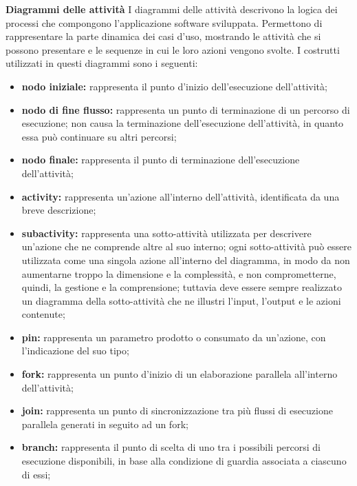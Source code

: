						\textbf{Diagrammi delle attività}
						\newline
						\newline
						\hangindent=0.6cm I diagrammi delle attività descrivono la logica dei processi che compongono l'applicazione software sviluppata. Permettono di rappresentare la parte dinamica dei casi d'uso, mostrando le attività che si possono presentare e le sequenze in cui le loro azioni vengono svolte.
						\newline
						\hangindent=0.6cm I costrutti utilizzati in questi diagrammi sono i seguenti:
						\begin{itemize}[leftmargin=1.5cm]
							\item \textbf{nodo iniziale:} rappresenta il punto d'inizio dell'esecuzione dell'attività;
							\item \textbf{nodo di fine flusso:} rappresenta un punto di terminazione di un percorso di esecuzione; non causa la terminazione dell'esecuzione dell'attività, in quanto essa può continuare su altri percorsi;
							\item \textbf{nodo finale:} rappresenta il punto di terminazione dell'esecuzione dell'attività;
							\item \textbf{activity:} rappresenta un'azione all'interno dell'attività, identificata da una breve descrizione;
							\item \textbf{subactivity:} rappresenta una sotto-attività utilizzata per descrivere un'azione che ne comprende altre al suo interno; ogni sotto-attività può essere utilizzata come una singola azione all'interno del diagramma, in modo da non aumentarne troppo la dimensione e la complessità, e non comprometterne, quindi, la gestione e la comprensione; tuttavia deve essere sempre realizzato un diagramma della sotto-attività che ne illustri l'input, l'output e le azioni contenute;
							\item \textbf{pin:} rappresenta un parametro prodotto o consumato da un'azione, con l'indicazione del suo tipo;
							\item \textbf{fork:} rappresenta un punto d'inizio di un elaborazione parallela all'interno dell'attività;
							\item \textbf{join:} rappresenta un punto di sincronizzazione tra più flussi di esecuzione parallela generati in seguito ad un fork;
							\item \textbf{branch:} rappresenta il punto di scelta di uno tra i possibili percorsi di esecuzione disponibili, in base alla condizione di guardia associata a ciascuno di essi;

\end{itemize}
